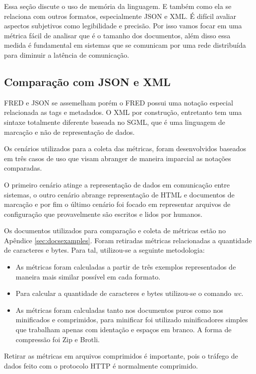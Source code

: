 Essa seção discute o uso de memória da linguagem. E também como ela 
se relaciona com outros formatos, especialmente JSON e XML. É difícil avaliar 
aspectos subjetivos como legibilidade e precisão. Por isso vamos focar em uma métrica fácil de 
analisar que é o tamanho dos documentos, além disso essa medida é fundamental em sistemas 
que se comunicam por uma rede distribuída para diminuir a latência de comunicação.

\subsection{Comparação com JSON e XML}

FRED e JSON se assemelham porém o FRED possui uma notação especial
relacionada as tags e metadados. O XML por construção, entretanto tem uma 
sintaxe totalmente diferente baseada no SGML, que é uma linguagem de marcação e não de
representação de dados.

Os cenários utilizados para a coleta das métricas, foram desenvolvidos
baseados em três casos de uso que visam abranger de maneira imparcial
as notações comparadas.

O primeiro cenário atinge a representação de dados em comunicação  
entre sistemas, o outro cenário abrange representação de HTML e documentos
de marcação e por fim o último cenário foi focado em representar arquivos de configuração que 
provavelmente são escritos e lidos por humanos.

Os documentos utilizados para comparação e coleta de métricas estão no Apêndice \ref{sec:docsexamples}.
Foram retiradas métricas relacionadas a quantidade de caracteres e bytes. Para tal, utilizou-se a seguinte
metodologia:

\begin{itemize}
    \item As métricas foram calculadas a partir de três exemplos representados 
    de maneira mais similar possível em cada formato.
    \item Para calcular a quantidade de caracteres e bytes utilizou-se o comando \textit{wc}.
    \item As métricas foram calculadas tanto nos documentos puros como nos minificados e 
    comprimidos, para minificar foi utilizado minificadores simples que trabalham apenas 
    com identação e espaços em branco. A forma de compressão foi Zip e Brotli.
\end{itemize}

Retirar as métricas em arquivos comprimidos é importante, pois o tráfego de dados feito
com o protocolo HTTP é normalmente comprimido.

